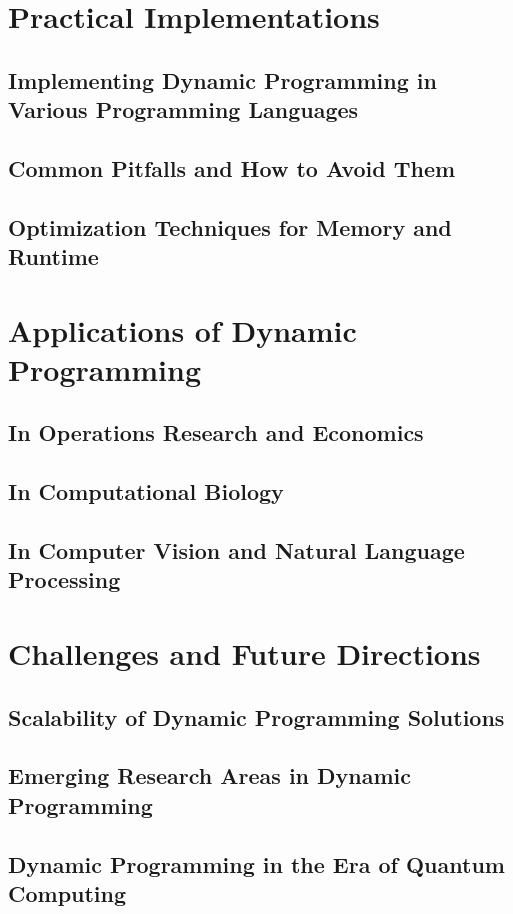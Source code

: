 \documentclass[12pt]{book} %
\begin{document}
\section{Practical Implementations}
\subsection{Implementing Dynamic Programming in Various Programming Languages}
\subsection{Common Pitfalls and How to Avoid Them}
\subsection{Optimization Techniques for Memory and Runtime}

\section{Applications of Dynamic Programming}
\subsection{In Operations Research and Economics}
\subsection{In Computational Biology}
\subsection{In Computer Vision and Natural Language Processing}

\section{Challenges and Future Directions}
\subsection{Scalability of Dynamic Programming Solutions}
\subsection{Emerging Research Areas in Dynamic Programming}
\subsection{Dynamic Programming in the Era of Quantum Computing}
\end{document}
